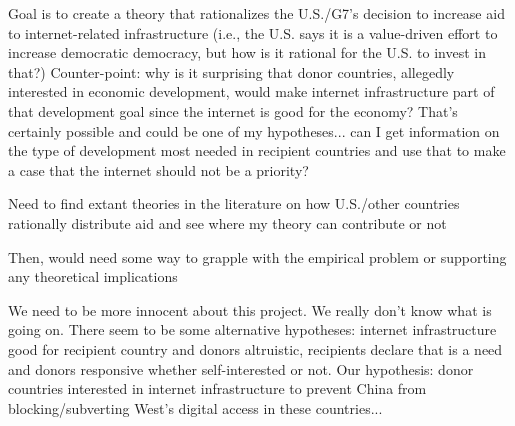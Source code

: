 Goal is to create a theory that rationalizes the U.S./G7's decision to increase aid to internet-related infrastructure (i.e., the U.S. says it is a value-driven effort to increase democratic democracy, but how is it rational for the U.S. to invest in that?) Counter-point: why is it surprising that donor countries, allegedly interested in economic development, would make internet infrastructure part of that development goal since the internet is good for the economy? That's certainly possible and could be one of my hypotheses... can I get information on the type of development most needed in recipient countries and use that to make a case that the internet should not be a priority?

Need to find extant theories in the literature on how U.S./other countries rationally distribute aid and see where my theory can contribute or not

Then, would need some way to grapple with the empirical problem or supporting any theoretical implications

We need to be more innocent about this project. We really don't know what is going on. There seem to be some alternative hypotheses: internet infrastructure good for recipient country and donors altruistic, recipients declare that is a need and donors responsive whether self-interested or not. Our hypothesis: donor countries interested in internet infrastructure to prevent China from blocking/subverting West's digital access in these countries...